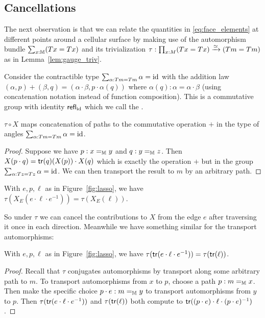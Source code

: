 \subsection{Cancellations}
The next observation is that we can relate the quantities in \ref{eq:face_elements} at different points around a cellular surface by making use of the automorphism bundle \( \sum_{x:\mathbb{M}}(Tx=Tx) \) and its trivialization \( \tau:\prod_{x:M}(Tx=Tx)\xrightarrow[]{\simeq}(Tm=Tm) \) as in Lemma~\ref{lem:gauge_triv}.

\begin{mydef}
Consider the contractible type \( \sum_{\alpha:Tm=Tm}\alpha=\text{id} \) with the addition law \( (\alpha, p)+(\beta, q) = (\alpha\cdot\beta, p\cdot \alpha(q)) \) where \( \alpha(q):\alpha=\alpha\cdot\beta \) (using concatenation notation instead of function composition). This is a commutative group with identity \( \mathsf{refl}_{\text{id}} \) which we call the .
\end{mydef}

\begin{mylemma}
\( \tau\circ X \) maps concatenation of paths to the commutative operation \( + \) in the type of angles \( \sum_{\alpha:Tm=Tm}\alpha=\text{id} \).
\end{mylemma}
\begin{proof}
Suppose we have \( p:x=_{\mathbb{M}} y \) and \( q:y=_{\mathbb{M}} z \). Then \( X(p\cdot q)=\mathsf{tr}(q)(X(p))\cdot X(q) \) which is exactly the operation \( + \) but in the group \( \sum_{\alpha:Tz=Tz}\alpha=\text{id} \). We can then transport the result to \( m \) by an arbitrary path.
\end{proof}

\begin{mycor}
\label{cor:x_cancel}
With \( e, p, \ell \) as in Figure~\ref{fig:lasso}, we have \(\tau(X_E(e\cdot\ell\cdot e^{-1})) = \tau(X_E(\ell))\).
\end{mycor}

So under \( \tau \) we can cancel the contributions to \( X \) from the edge \( e \) after traversing it once in each direction. Meanwhile we have something similar for the transport automorphisms:

\begin{mylemma}
With \( e, p, \ell \) as in Figure~\ref{fig:lasso}, we have \( \tau(\mathsf{tr}(e\cdot\ell\cdot e^{-1}))=\tau(\mathsf{tr}(\ell)) \).
\end{mylemma}
\begin{proof}
Recall that \( \tau \) conjugates automorphisms by transport along some arbitrary path to \( m \). To transport automorphisms from \( x \) to \( p \), choose a path \( p:m=_{\mathbb{M}} x \). Then make the specific choice \( p\cdot e:m=_{\mathbb{M}} y \) to transport automorphisms from \( y \) to \( p \). Then \( \tau(\mathsf{tr}(e\cdot\ell\cdot e^{-1})) \) and \( \tau(\mathsf{tr}(\ell)) \) both compute to \( \mathsf{tr}((p\cdot e)\cdot\ell\cdot(p\cdot e)^{-1}) \). 
\end{proof}

